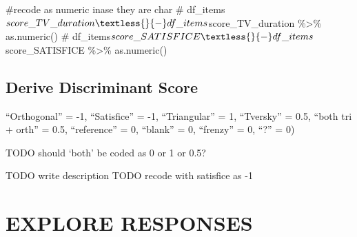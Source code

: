 \documentclass[
  letterpaper,
  DIV=11,
  numbers=noendperiod]{scrreprt}
\newenvironment{Shaded}{\begin{snugshade}}{\end{snugshade}}
\newcommand{\CommentTok}[1]{\textcolor[rgb]{0.37,0.37,0.37}{#1}}
\newcommand{\DecValTok}[1]{\textcolor[rgb]{0.68,0.00,0.00}{#1}}
\newcommand{\FloatTok}[1]{\textcolor[rgb]{0.68,0.00,0.00}{#1}}
\newcommand{\FunctionTok}[1]{\textcolor[rgb]{0.28,0.35,0.67}{#1}}
\newcommand{\NormalTok}[1]{\textcolor[rgb]{0.00,0.23,0.31}{#1}}
\newcommand{\OtherTok}[1]{\textcolor[rgb]{0.00,0.23,0.31}{#1}}
\newcommand{\SpecialCharTok}[1]{\textcolor[rgb]{0.37,0.37,0.37}{#1}}
\newcommand{\StringTok}[1]{\textcolor[rgb]{0.13,0.47,0.30}{#1}}
\begin{document}
\begin{Shaded}
\begin{Highlighting}[]
\CommentTok{\#recode as numeric inase they are char }
\CommentTok{\# df\_items$score\_TV\_duration \textless{}{-} df\_items$score\_TV\_duration \%\textgreater{}\% as.numeric()}
\CommentTok{\# df\_items$score\_SATISFICE \textless{}{-} df\_items$score\_SATISFICE \%\textgreater{}\% as.numeric()}
\end{Highlighting}
\end{Shaded}

\hypertarget{derive-discriminant-score}{%
\subsection{Derive Discriminant Score}\label{derive-discriminant-score}}

``Orthogonal'' = -1, ``Satisfice'' = -1, ``Triangular'' = 1, ``Tversky''
= 0.5, ``both tri + orth'' = 0.5, ``reference'' = 0, ``blank'' = 0,
``frenzy'' = 0, ``?'' = 0)

TODO should `both' be coded as 0 or 1 or 0.5?

TODO write description TODO recode with satisfice as -1

\begin{Shaded}
\end{Shaded}

\hypertarget{explore-responses}{%
\section{EXPLORE RESPONSES}\label{explore-responses}}
\end{document}
